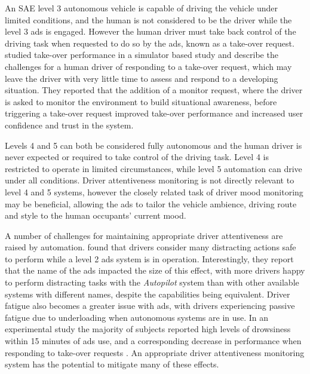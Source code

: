 \documentclass[11pt, parskip=half*,twoside=false]{scrbook}
\begin{document}
An SAE level 3 autonomous vehicle is capable of driving the vehicle under limited conditions, and the human is not considered to be the driver while the level 3 \gls{ads} is engaged. However the human driver must take back control of the driving task when requested to do so by the \gls{ads}, known as a take-over request.  \citet{luMereTakeoverRequests2019} studied take-over performance in a simulator based study and describe the challenges for a human driver of responding to a take-over request, which may leave the driver with very little time to assess and respond to a developing situation. They reported that the addition of a monitor request, where the driver is asked to monitor the environment to build situational awareness, before triggering a take-over request improved take-over performance and increased user confidence and trust in the system.

Levels 4 and 5 can both be considered fully autonomous and the human driver is never expected or required to take control of the driving task. Level 4 is restricted to operate in limited circumstances, while level 5 automation can drive under all conditions. Driver attentiveness monitoring is not directly relevant to level 4 and 5 systems, however the closely related task of driver mood monitoring may be beneficial, allowing the \gls{ads} to tailor the vehicle ambience, driving route and style to the human occupants' current mood.

A number of challenges for maintaining appropriate driver attentiveness are raised by automation. \citet{teohWhatNameDrivers2020} found that drivers consider many distracting actions safe to perform while a level 2 \gls{ads} system is in operation. Interestingly, they report that the name of the \gls{ads} impacted the size of this effect, with more drivers happy to perform distracting tasks with the \emph{Autopilot} system than with other available systems with different names, despite the capabilities being equivalent. Driver fatigue also becomes a greater issue with \gls{ads}, with drivers experiencing passive fatigue due to underloading when autonomous systems are in use. In an experimental study the majority of subjects reported high levels of drowsiness within 15 minutes of \gls{ads} use, and a corresponding decrease in performance when responding to take-over requests \citep{goncalvesDrowsinessConditionalAutomation2016}. An appropriate driver attentiveness monitoring system has the potential to mitigate many of these effects. 
\end{document}
